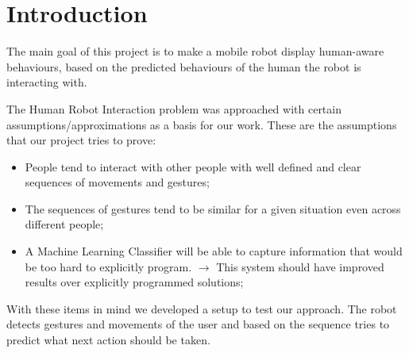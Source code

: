
\section{Introduction}
The main goal of this project is to make a mobile robot display human-aware behaviours, based on the predicted behaviours of the human the robot is interacting with. 



The Human Robot Interaction problem was approached with certain assumptions/approximations as a basis for our work. These are the assumptions that our project tries to prove: 

\begin{itemize}
\item People tend to interact with other people with well defined and clear sequences of movements and gestures;
\item The sequences of gestures tend to be similar for a given situation even across different people;
\item A Machine Learning Classifier will be able to capture information that would be too hard to explicitly program. $\rightarrow$ This system should have improved results over explicitly programmed solutions;
\end{itemize}

With these items in mind we developed a setup to test our approach. The robot detects gestures and movements of the user and based on the sequence tries to predict what next action should be taken.



